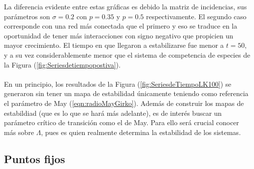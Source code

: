 La diferencia evidente entre estas gráficas es debido la matriz de incidencias, sus parámetros son $\sigma=0.2$ con $p=0.35$ y $p=0.5$ respectivamente. El segundo caso corresponde con una red más conectada que el primero y eso se traduce en la oportunidad de tener más interacciones con signo negativo que propicien un mayor crecimiento. El tiempo en que llegaron a estabilizarse fue menor a $t=50$, y a su vez considerablemente menor que el sistema de competencia de especies de la Figura (\ref{fig:Seriesdetiempopostiva}). 
\\
\\
En un principio, los resultados de la Figura (\ref{fig:SeriesdeTiempoLK100}) se generaron sin tener un mapa de estabilidad únicamente teniendo como referencia el parámetro de May (\ref{eqn:radioMayGirko}). Además de construir los mapas de estabildiad (que es lo que se hará más adelante), es de interés buscar un parámetro crítico de transición como el de May. Para ello será crucial conocer más sobre $\Lambda$, pues es quien realmente determina la estabilidad de los sistemas.

\subsection{Puntos fijos}\label{subsec:PuntosFijos}


